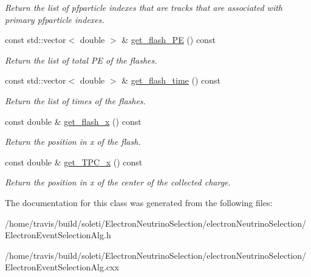 \begin{DoxyCompactItemize}
\begin{DoxyCompactList}\small\item\em Return the list of pfparticle indexes that are tracks that are associated with primary pfparticle indexes. \end{DoxyCompactList}\item 
\hypertarget{group__lee_ga306e62904f73e727c6f938d2a197f68e}{const std\-::vector$<$ double $>$ \& \hyperlink{group__lee_ga306e62904f73e727c6f938d2a197f68e}{get\-\_\-flash\-\_\-\-P\-E} () const }\label{group__lee_ga306e62904f73e727c6f938d2a197f68e}

\begin{DoxyCompactList}\small\item\em Return the list of total P\-E of the flashes. \end{DoxyCompactList}\item 
\hypertarget{group__lee_ga9990f4a980662e786fc8e38146ce4456}{const std\-::vector$<$ double $>$ \& \hyperlink{group__lee_ga9990f4a980662e786fc8e38146ce4456}{get\-\_\-flash\-\_\-time} () const }\label{group__lee_ga9990f4a980662e786fc8e38146ce4456}

\begin{DoxyCompactList}\small\item\em Return the list of times of the flashes. \end{DoxyCompactList}\item 
\hypertarget{group__lee_ga69b697a2eec43de221621bd4aca906e2}{const double \& \hyperlink{group__lee_ga69b697a2eec43de221621bd4aca906e2}{get\-\_\-flash\-\_\-x} () const }\label{group__lee_ga69b697a2eec43de221621bd4aca906e2}

\begin{DoxyCompactList}\small\item\em Return the position in x of the flash. \end{DoxyCompactList}\item 
\hypertarget{group__lee_ga2c653a5d3225c3e3aa5dc84738ffa086}{const double \& \hyperlink{group__lee_ga2c653a5d3225c3e3aa5dc84738ffa086}{get\-\_\-\-T\-P\-C\-\_\-x} () const }\label{group__lee_ga2c653a5d3225c3e3aa5dc84738ffa086}

\begin{DoxyCompactList}\small\item\em Return the position in x of the center of the collected charge. \end{DoxyCompactList}\end{DoxyCompactItemize}


The documentation for this class was generated from the following files\-:\begin{DoxyCompactItemize}
\item 
/home/travis/build/soleti/\-Electron\-Neutrino\-Selection/electron\-Neutrino\-Selection/Electron\-Event\-Selection\-Alg.\-h\item 
/home/travis/build/soleti/\-Electron\-Neutrino\-Selection/electron\-Neutrino\-Selection/Electron\-Event\-Selection\-Alg.\-cxx\end{DoxyCompactItemize}
